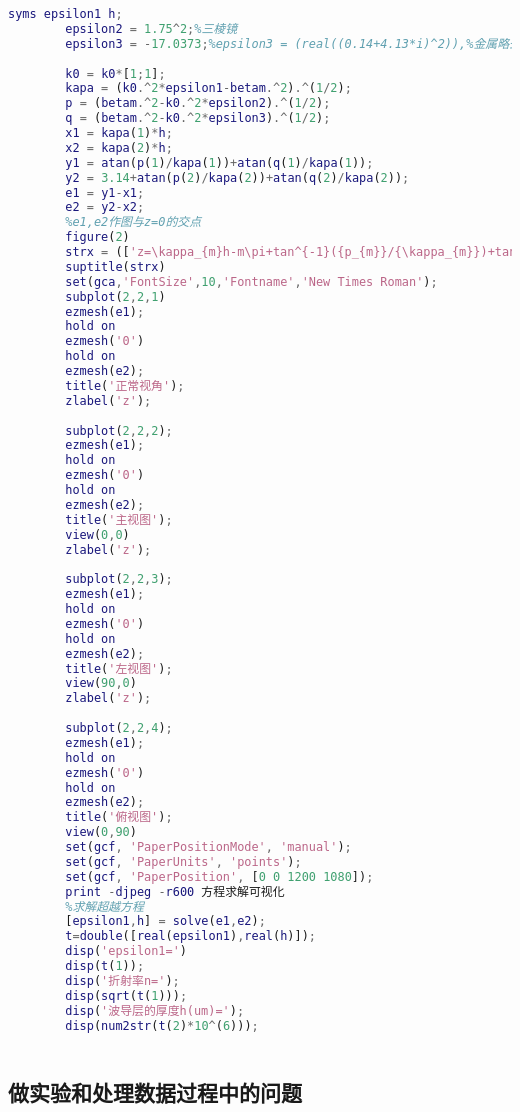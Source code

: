 \documentclass{zjureport}
\begin{document}
\begin{clause}
\begin{lstlisting}[language=MATLAB]
		syms epsilon1 h;
		epsilon2 = 1.75^2;%三棱镜
		epsilon3 = -17.0373;%epsilon3 = (real((0.14+4.13*i)^2)),%金属略去虚部
		
		k0 = k0*[1;1];
		kapa = (k0.^2*epsilon1-betam.^2).^(1/2);
		p = (betam.^2-k0.^2*epsilon2).^(1/2);
		q = (betam.^2-k0.^2*epsilon3).^(1/2);
		x1 = kapa(1)*h;
		x2 = kapa(2)*h;
		y1 = atan(p(1)/kapa(1))+atan(q(1)/kapa(1));
		y2 = 3.14+atan(p(2)/kapa(2))+atan(q(2)/kapa(2));
		e1 = y1-x1;
		e2 = y2-x2;
		%e1,e2作图与z=0的交点
		figure(2)
		strx = (['z=\kappa_{m}h-m\pi+tan^{-1}({p_{m}}/{\kappa_{m}})+tan^{-1}({q_{m}}/{\kappa_{m}})=0 m=0,1']);
		suptitle(strx)
		set(gca,'FontSize',10,'Fontname','New Times Roman');
		subplot(2,2,1)
		ezmesh(e1);
		hold on 
		ezmesh('0')
		hold on
		ezmesh(e2);
		title('正常视角');
		zlabel('z');
		
		subplot(2,2,2);
		ezmesh(e1);
		hold on 
		ezmesh('0')
		hold on
		ezmesh(e2);
		title('主视图');
		view(0,0)
		zlabel('z');
		
		subplot(2,2,3);
		ezmesh(e1);
		hold on 
		ezmesh('0')
		hold on
		ezmesh(e2);
		title('左视图');
		view(90,0)
		zlabel('z');
		
		subplot(2,2,4);
		ezmesh(e1);
		hold on 
		ezmesh('0')
		hold on
		ezmesh(e2);
		title('俯视图');
		view(0,90)
		set(gcf, 'PaperPositionMode', 'manual');
		set(gcf, 'PaperUnits', 'points');
		set(gcf, 'PaperPosition', [0 0 1200 1080]);
		print -djpeg -r600 方程求解可视化
		%求解超越方程
		[epsilon1,h] = solve(e1,e2);
		t=double([real(epsilon1),real(h)]);
		disp('epsilon1=')
		disp(t(1));
		disp('折射率n=');
		disp(sqrt(t(1)));
		disp('波导层的厚度h(um)=');
		disp(num2str(t(2)*10^(6)));
		
		\end{lstlisting}
	\end{clause}
   \subsection{做实验和处理数据过程中的问题}
   	~\\
   ~\\
   ~\\
   ~\\
   ~\\
   ~\\
   ~\\
   ~\\
   ~\\
   ~\\
   ~\\
   ~\\
   ~\\
   ~\\
   ~\\
\end{document}
